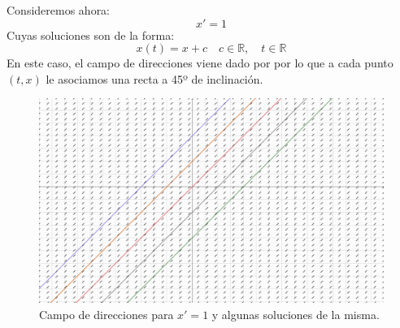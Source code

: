 \begin{ejemplo}
    Consideremos ahora:
    \begin{equation*}
        x' = 1
    \end{equation*}
    Cuyas soluciones son de la forma:
    \begin{equation*}
        x(t) = x + c \quad c\in \mathbb{R}, \quad t\in \mathbb{R}
    \end{equation*}
    En este caso, el campo de direcciones viene dado por
    por lo que a cada punto $(t,x)$ le asociamos una recta a 45º de inclinación.

    \begin{figure}[H]
        \centering
        \includegraphics[width=0.6\linewidth]{Imagenes/campo_direcciones_2.png}
        \caption{Campo de direcciones para $x'=1$ y algunas soluciones de la misma.}
    \end{figure}
\end{ejemplo}

